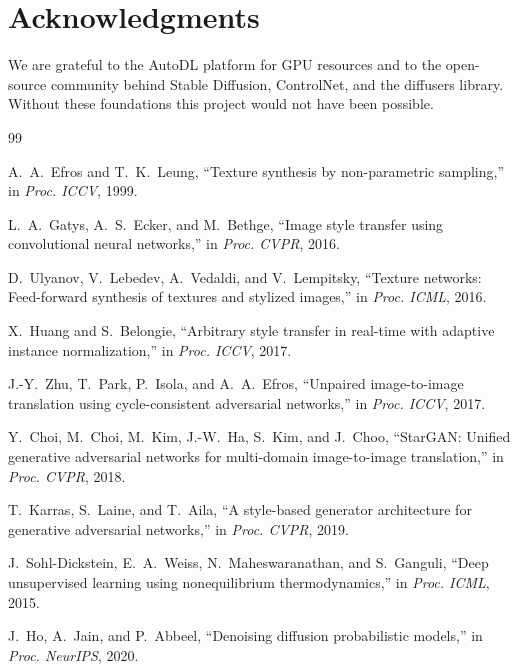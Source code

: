 \documentclass[10pt,twocolumn]{article}
\begin{document}
\section*{Acknowledgments}
We are grateful to the AutoDL platform for GPU resources and to the open-source community behind Stable Diffusion, ControlNet, and the diffusers library. Without these foundations this project would not have been possible.

\begin{thebibliography}{99}

 A.~A.~Efros and T.~K.~Leung, ``Texture synthesis by non-parametric sampling,'' in \emph{Proc. ICCV}, 1999.

 L.~A.~Gatys, A.~S.~Ecker, and M.~Bethge, ``Image style transfer using convolutional neural networks,'' in \emph{Proc. CVPR}, 2016.

 D.~Ulyanov, V.~Lebedev, A.~Vedaldi, and V.~Lempitsky, ``Texture networks: Feed-forward synthesis of textures and stylized images,'' in \emph{Proc. ICML}, 2016.

 X.~Huang and S.~Belongie, ``Arbitrary style transfer in real-time with adaptive instance normalization,'' in \emph{Proc. ICCV}, 2017.

 J.-Y.~Zhu, T.~Park, P.~Isola, and A.~A.~Efros, ``Unpaired image-to-image translation using cycle-consistent adversarial networks,'' in \emph{Proc. ICCV}, 2017.

 Y.~Choi, M.~Choi, M.~Kim, J.-W.~Ha, S.~Kim, and J.~Choo, ``StarGAN: Unified generative adversarial networks for multi-domain image-to-image translation,'' in \emph{Proc. CVPR}, 2018.

 T.~Karras, S.~Laine, and T.~Aila, ``A style-based generator architecture for generative adversarial networks,'' in \emph{Proc. CVPR}, 2019.

 J.~Sohl-Dickstein, E.~A.~Weiss, N.~Maheswaranathan, and S.~Ganguli, ``Deep unsupervised learning using nonequilibrium thermodynamics,'' in \emph{Proc. ICML}, 2015.

 J.~Ho, A.~Jain, and P.~Abbeel, ``Denoising diffusion probabilistic models,'' in \emph{Proc. NeurIPS}, 2020.


\end{thebibliography}
\end{document}
